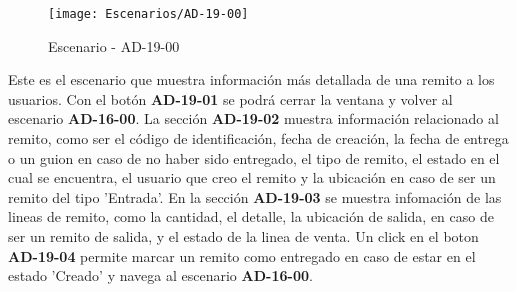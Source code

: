 \begin{figure}[H]
\centering
\texttt{[image: Escenarios/AD-19-00]}
\caption{Escenario - AD-19-00}
\label{fig:AD-19-00}
\end{figure}
Este es el escenario que muestra información más detallada de una remito a los usuarios.
Con el botón \textbf{AD-19-01} se podrá cerrar la ventana y volver al escenario \textbf{AD-16-00}. La sección \textbf{AD-19-02} muestra información relacionado al remito, como ser el código de identificación, fecha de creación, la fecha de entrega o un guion en caso de no haber sido entregado, el tipo de remito, el estado en el cual se encuentra, el usuario que creo el remito y la ubicación en caso de ser un remito del tipo 'Entrada'.
En la sección \textbf{AD-19-03} se muestra infomación de las lineas de remito, como la cantidad, el detalle, la ubicación de salida, en caso de ser un remito de salida, y el estado de la linea de venta. Un click en el boton \textbf{AD-19-04} permite marcar un remito como entregado en caso de estar en el estado 'Creado' y navega al escenario \textbf{AD-16-00}. 
\clearpage
